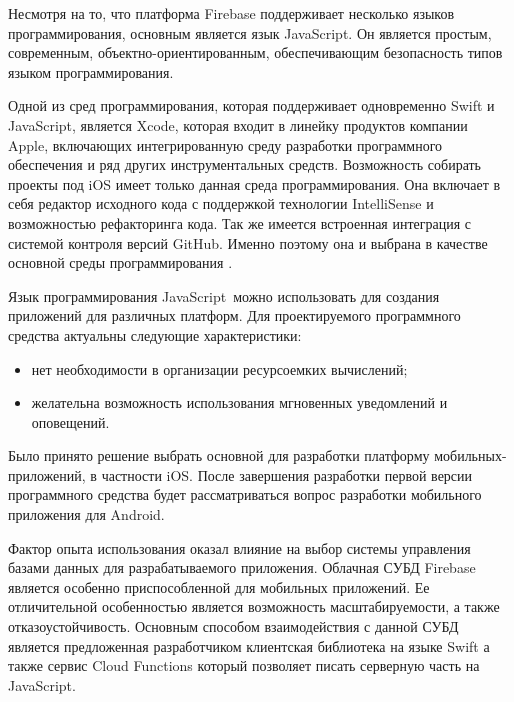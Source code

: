 Несмотря на то, что платформа Firebase поддерживает несколько языков программирования, основным является язык JavaScript. Он является простым, современным, объектно-ориентированным, обеспечивающим безопасность типов языком программирования.

Одной из сред программирования, которая поддерживает одновременно Swift и JavaScript, является Xcode, которая входит в линейку продуктов компании Apple, включающих интегрированную среду разработки программного обеспечения и ряд других инструментальных средств. Возможность собирать проекты под iOS имеет только данная среда программирования. Она включает в себя редактор исходного кода с поддержкой технологии In\-tel\-li\-Sen\-se и возможностью рефакторинга кода. Так же имеется встроенная интеграция с системой контроля версий GitHub. Именно поэтому она и выбрана в качестве основной среды программирования \cite{xcode_info}.

Язык программирования JavaScript~можно использовать для создания приложений для различных платформ. Для проектируемого программного сре\-д\-с\-т\-ва актуальны следующие характеристики:
\begin{itemize}
  \item нет необходимости в организации ресурсоемких вычислений;
  \item желательна возможность использования мгновенных уведомлений и оповещений.
\end{itemize}

Было принято решение выбрать основной для разработки платформу мобильных-приложений, в частности iOS. После завершения разработки первой версии программного средства будет рассматриваться вопрос разработки мобильного приложения для Android.

Фактор опыта использования оказал влияние на выбор  системы управления базами данных для разрабатываемого приложения. Облачная СУБД Firebase является особенно приспособленной для мобильных приложений. Ее отличительной особенностью является возможность масштабируемости, а также отказоустойчивость. Основным способом взаимодействия с данной СУБД является предложенная разработчиком клиентская библиотека на языке Swift а также сервис Cloud Functions который позволяет писать серверную часть на JavaScript.